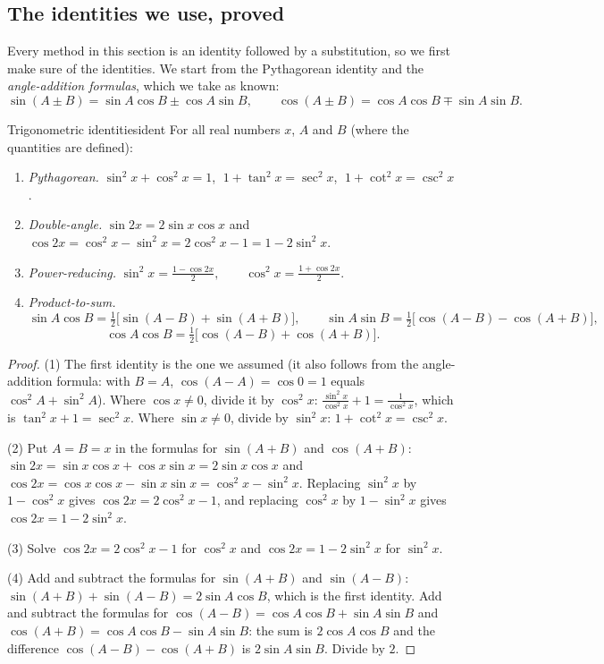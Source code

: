 \documentclass[11pt]{article}
\begin{document}
\subsection*{The identities we use, proved}

Every method in this section is an identity followed by a substitution, so we first make sure of the identities. We start from the Pythagorean identity and the \emph{angle-addition formulas}, which we take as known:
\[\sin(A\pm B)=\sin A\cos B\pm\cos A\sin B,\qquad\cos(A\pm B)=\cos A\cos B\mp\sin A\sin B .\]

\begin{thm}{Trigonometric identities}{ident}
For all real numbers $x$, $A$ and $B$ (where the quantities are defined):
\begin{enumerate}[label=(\arabic*)]
  \item \emph{Pythagorean.} $\sin^2x+\cos^2x=1$, $\;1+\tan^2x=\sec^2x$, $\;1+\cot^2x=\csc^2x$.
  \item \emph{Double-angle.} $\sin2x=2\sin x\cos x$ and $\cos2x=\cos^2x-\sin^2x=2\cos^2x-1=1-2\sin^2x$.
  \item \emph{Power-reducing.} $\displaystyle\sin^2x=\frac{1-\cos2x}2,\qquad\cos^2x=\frac{1+\cos2x}2$.
  \item \emph{Product-to-sum.}
  \[\sin A\cos B=\tfrac12\big[\sin(A-B)+\sin(A+B)\big],\qquad\sin A\sin B=\tfrac12\big[\cos(A-B)-\cos(A+B)\big],\]
  \[\cos A\cos B=\tfrac12\big[\cos(A-B)+\cos(A+B)\big].\]
\end{enumerate}
\end{thm}
\begin{proof}
(1) The first identity is the one we assumed (it also follows from the angle-addition formula: with $B=A$, $\cos(A-A)=\cos0=1$ equals $\cos^2A+\sin^2A$). Where $\cos x\ne0$, divide it by $\cos^2x$: $\frac{\sin^2x}{\cos^2x}+1=\frac1{\cos^2x}$, which is $\tan^2x+1=\sec^2x$. Where $\sin x\ne0$, divide by $\sin^2x$: $1+\cot^2x=\csc^2x$.

(2) Put $A=B=x$ in the formulas for $\sin(A+B)$ and $\cos(A+B)$: $\sin2x=\sin x\cos x+\cos x\sin x=2\sin x\cos x$ and $\cos2x=\cos x\cos x-\sin x\sin x=\cos^2x-\sin^2x$. Replacing $\sin^2x$ by $1-\cos^2x$ gives $\cos2x=2\cos^2x-1$, and replacing $\cos^2x$ by $1-\sin^2x$ gives $\cos2x=1-2\sin^2x$.

(3) Solve $\cos2x=2\cos^2x-1$ for $\cos^2x$ and $\cos2x=1-2\sin^2x$ for $\sin^2x$.

(4) Add and subtract the formulas for $\sin(A+B)$ and $\sin(A-B)$: $\sin(A+B)+\sin(A-B)=2\sin A\cos B$, which is the first identity. Add and subtract the formulas for $\cos(A-B)=\cos A\cos B+\sin A\sin B$ and $\cos(A+B)=\cos A\cos B-\sin A\sin B$: the sum is $2\cos A\cos B$ and the difference $\cos(A-B)-\cos(A+B)$ is $2\sin A\sin B$. Divide by $2$.
\end{proof}
\end{document}
